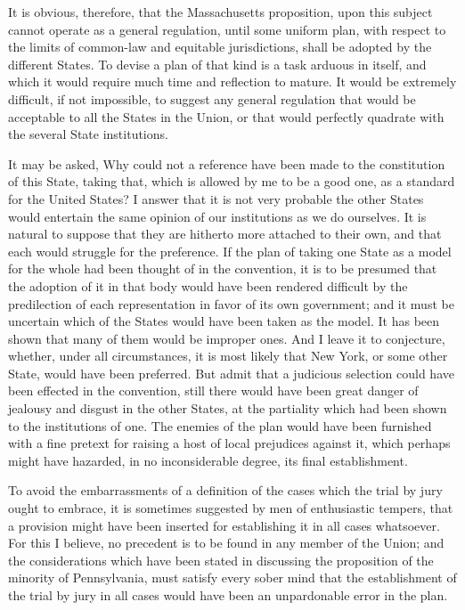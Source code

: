 It is obvious, therefore, that the Massachusetts proposition, upon this subject cannot operate as a general regulation, until some uniform plan, with respect to the limits of common-law and equitable jurisdictions, shall be adopted by the different States. To devise a plan of that kind is a task arduous in itself, and which it would require much time and reflection to mature. It would be extremely difficult, if not impossible, to suggest any general regulation that would be acceptable to all the States in the Union, or that would perfectly quadrate with the several State institutions.

It may be asked, Why could not a reference have been made to the constitution of this State, taking that, which is allowed by me to be a good one, as a standard for the United States? I answer that it is not very probable the other States would entertain the same opinion of our institutions as we do ourselves. It is natural to suppose that they are hitherto more attached to their own, and that each would struggle for the preference. If the plan of taking one State as a model for the whole had been thought of in the convention, it is to be presumed that the adoption of it in that body would have been rendered difficult by the predilection of each representation in favor of its own government; and it must be uncertain which of the States would have been taken as the model. It has been shown that many of them would be improper ones. And I leave it to conjecture, whether, under all circumstances, it is most likely that New York, or some other State, would have been preferred. But admit that a judicious selection could have been effected in the convention, still there would have been great danger of jealousy and disgust in the other States, at the partiality which had been shown to the institutions of one. The enemies of the plan would have been furnished with a fine pretext for raising a host of local prejudices against it, which perhaps might have hazarded, in no inconsiderable degree, its final establishment.

To avoid the embarrassments of a definition of the cases which the trial by jury ought to embrace, it is sometimes suggested by men of enthusiastic tempers, that a provision might have been inserted for establishing it in all cases whatsoever. For this I believe, no precedent is to be found in any member of the Union; and the considerations which have been stated in discussing the proposition of the minority of Pennsylvania, must satisfy every sober mind that the establishment of the trial by jury in all cases would have been an unpardonable error in the plan.

